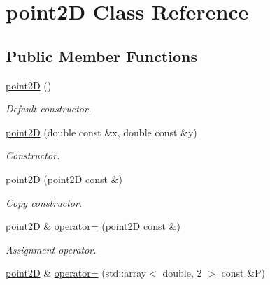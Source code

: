 \hypertarget{classpoint2D}{
\section{point2D Class Reference}
\label{classpoint2D}
}
\subsection*{Public Member Functions}
\begin{DoxyCompactItemize}
\item 
\hypertarget{classpoint2D_a505e4b950588a3b70225d5e2e4b663e5}{
\hyperlink{classpoint2D_a505e4b950588a3b70225d5e2e4b663e5}{point2D} ()}
\label{classpoint2D_a505e4b950588a3b70225d5e2e4b663e5}

\begin{DoxyCompactList}\small\item\em Default constructor. \item\end{DoxyCompactList}\item 
\hypertarget{classpoint2D_a0ff85cbd13d7bdaeb225eb729b201e26}{
\hyperlink{classpoint2D_a0ff85cbd13d7bdaeb225eb729b201e26}{point2D} (double const \&x, double const \&y)}
\label{classpoint2D_a0ff85cbd13d7bdaeb225eb729b201e26}

\begin{DoxyCompactList}\small\item\em Constructor. \item\end{DoxyCompactList}\item 
\hypertarget{classpoint2D_a1b31e078a767cc94fe1e7ab09ff61343}{
\hyperlink{classpoint2D_a1b31e078a767cc94fe1e7ab09ff61343}{point2D} (\hyperlink{classpoint2D}{point2D} const \&)}
\label{classpoint2D_a1b31e078a767cc94fe1e7ab09ff61343}

\begin{DoxyCompactList}\small\item\em Copy constructor. \item\end{DoxyCompactList}\item 
\hypertarget{classpoint2D_ad93a1a3a900e6befe584d033341f029d}{
\hyperlink{classpoint2D}{point2D} \& \hyperlink{classpoint2D_ad93a1a3a900e6befe584d033341f029d}{operator=} (\hyperlink{classpoint2D}{point2D} const \&)}
\label{classpoint2D_ad93a1a3a900e6befe584d033341f029d}

\begin{DoxyCompactList}\small\item\em Assignment operator. \item\end{DoxyCompactList}\item 
\hypertarget{classpoint2D_acd077d6c90eaba097ef9c288a1195e5a}{
\hyperlink{classpoint2D}{point2D} \& \hyperlink{classpoint2D_acd077d6c90eaba097ef9c288a1195e5a}{operator=} (std::array$<$ double, 2 $>$ const \&P)}
\label{classpoint2D_acd077d6c90eaba097ef9c288a1195e5a}


\end{DoxyCompactItemize}
